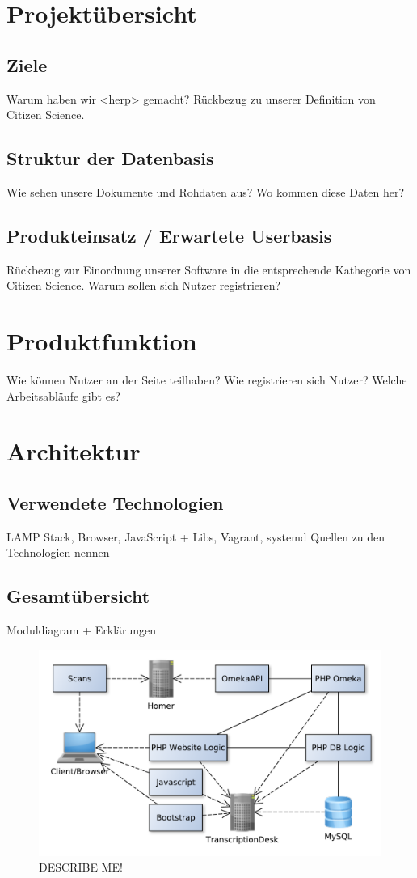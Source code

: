 \documentclass{article}
\begin{document}
\section{Projektübersicht}
\subsection{Ziele}
Warum haben wir <herp> gemacht?
Rückbezug zu unserer Definition von Citizen Science.
\subsection{Struktur der Datenbasis}
Wie sehen unsere Dokumente und Rohdaten aus?
Wo kommen diese Daten her?
\subsection{Produkteinsatz / Erwartete Userbasis}
Rückbezug zur Einordnung unserer Software in die entsprechende Kathegorie von Citizen Science.
Warum sollen sich Nutzer registrieren?
\section{Produktfunktion}
Wie können Nutzer an der Seite teilhaben?
Wie registrieren sich Nutzer?
Welche Arbeitsabläufe gibt es?
\section{Architektur}
\subsection{Verwendete Technologien}
LAMP Stack, Browser, JavaScript + Libs, Vagrant, systemd 
Quellen zu den Technologien nennen
\subsection{Gesamtübersicht}
Moduldiagram + Erklärungen
\\\begin{figure}
\includegraphics[width=\textwidth]{../notes/components.pdf}
\caption{DESCRIBE ME!}
\label{fig:components}
\end{figure}
\end{document}

